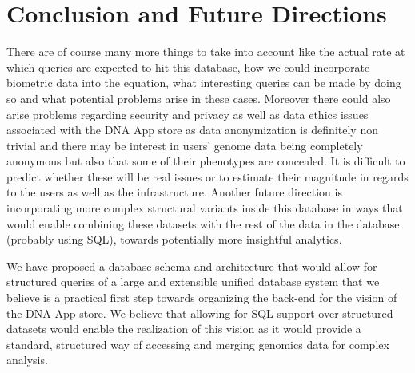 \documentclass[conference,twocolumn,10pt]{IEEEtran}
\begin{document}

\section{Conclusion and Future Directions}
There are of course many more things to take into account like the actual rate at which queries are expected to hit this database, how we could incorporate biometric data into the equation, what interesting queries can be made by doing so and what potential problems arise in these cases. Moreover there could also arise problems regarding security and privacy as well as data ethics issues associated with the DNA App store as data anonymization is definitely non trivial and there may be interest in users’ genome data being completely anonymous but also that some of their phenotypes are concealed. It is difficult to predict whether these will be real issues or to estimate their magnitude in regards to the users as well as the infrastructure. Another future direction is incorporating more complex structural variants inside this database in ways that would enable combining these datasets with the rest of the data in the database (probably using SQL), towards potentially more insightful analytics.

We have proposed a database schema and architecture that would allow for structured queries of a large and extensible unified database system that we believe is a practical first step towards organizing the back-end for the vision of the DNA App store. We believe that allowing for SQL support over structured datasets would enable the realization of this vision as it would provide a standard, structured way of accessing and merging genomics data for complex analysis.









\end{document}
